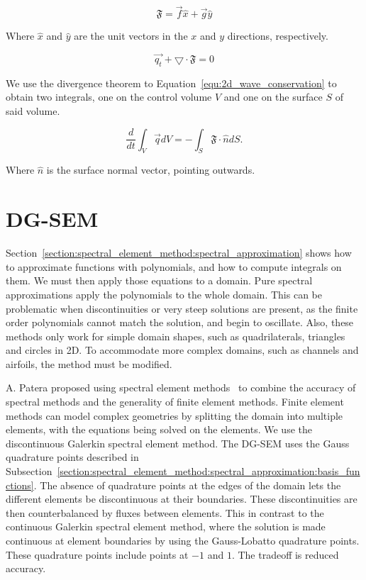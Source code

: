 \begin{equation} \label{equ:2d_wave_fluxes}
	\mathfrak{F} = \overrightarrow{f}\widehat{x} + \overrightarrow{g}\widehat{y}
\end{equation}

Where $\widehat{x}$ and $\widehat{y}$ are the unit vectors in the $x$ and $y$ directions,
respectively. 

\begin{equation} \label{equ:2d_wave_conservation}
	\overrightarrow{q_t} + \bigtriangledown \cdot \mathfrak{F} = 0
\end{equation}

We use the divergence theorem to Equation~\ref{equ:2d_wave_conservation} to obtain two integrals,
one on the control volume $V$ and one on the surface $S$ of said volume.

\begin{equation} \label{equ:2d_wave_integral}
	\frac{d}{dt}\int_{V}\overrightarrow{q}dV = -\int_{S}\mathfrak{F}\cdot \widehat{n}dS. 
\end{equation}

Where $\widehat{n}$ is the surface normal vector, pointing outwards.

\section{DG-SEM} \label{section:spectral_element_method:dg_sem}
Section~\ref{section:spectral_element_method:spectral_approximation} shows how to approximate
functions with polynomials, and how to compute integrals on them. We must then apply those equations
to a domain. Pure spectral approximations apply the polynomials to the whole domain. This can be
problematic when discontinuities or very steep solutions are present, as the finite order
polynomials cannot match the solution, and begin to oscillate. Also, these methods only work for
simple domain shapes, such as quadrilaterals, triangles and circles in 2D. To accommodate more
complex domains, such as channels and airfoils, the method must be modified.

A. Patera proposed using spectral element methods~\cite{Patera1984} to combine the accuracy of
spectral methods and the generality of finite element methods. Finite element methods can model
complex geometries by splitting the domain into multiple elements, with the equations being solved
on the elements. We use the discontinuous Galerkin spectral element method. The DG-SEM uses the 
Gauss quadrature points described in
Subsection~\ref{section:spectral_element_method:spectral_approximation:basis_functions}. The absence
of quadrature points at the edges of the domain lets the different elements be discontinuous at
their boundaries. These discontinuities are then counterbalanced by fluxes between elements. This in
contrast to the continuous Galerkin spectral element method, where the solution is made continuous 
at element boundaries by using the Gauss-Lobatto quadrature points. These quadrature points include
points at $-1$ and $1$. The tradeoff is reduced accuracy.

